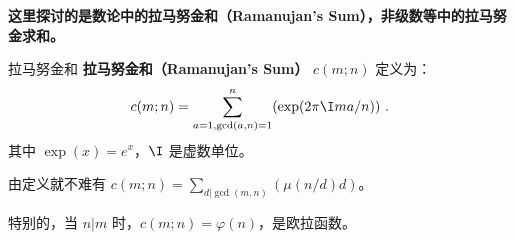 
\textbf{这里探讨的是数论中的拉马努金和（Ramanujan's Sum），非级数等中的拉马努金求和。}

\begin{definition}{拉马努金和}
\textbf{拉马努金和（Ramanujan's Sum）} $c(m; n)$ 定义为：
\begin{equation}
c(m; n) = \sum_{a=1, \gcd(a, n) = 1}^n (\exp(2\pi \I m a / n)) ~.
\end{equation}
其中 $\exp(x) = e^x$，$\I$ 是虚数单位。
\end{definition}

由定义就不难有 $c(m; n) = \sum_{d | \gcd(m, n)} (\mu(n/d) d)$。

特别的，当 $n | m$ 时，$c(m; n) = \varphi(n)$，是欧拉函数。